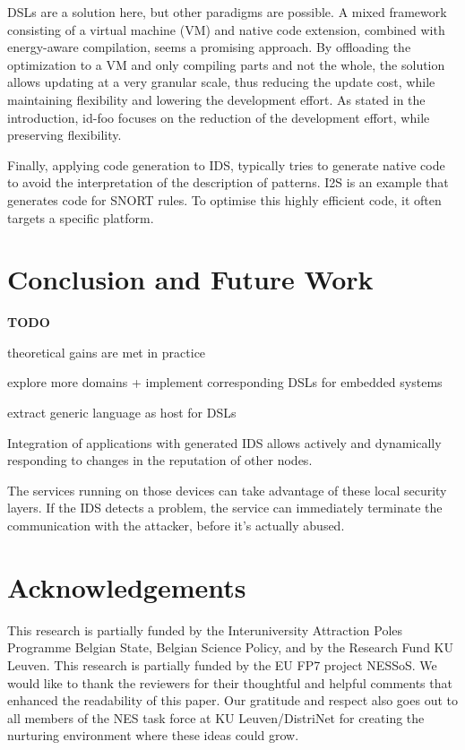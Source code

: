 \documentclass[conference]{IEEEtran}
\newcommand{\TODO}{\textbf{\color{red}TODO}}
\newcommand{\NAME}{id-foo\xspace}
\begin{document}
DSLs are a solution here, but other paradigms are possible. A mixed framework
consisting of a virtual machine (VM) and native code
extension\cite{sadilek2007energy}, combined with energy-aware compilation,
seems a promising approach. By offloading the optimization to a VM and only
compiling parts and not the whole, the solution allows updating at a very
granular scale, thus reducing the update cost, while maintaining flexibility
and lowering the development effort. As stated in the introduction, \NAME
focuses on the reduction of the development effort, while preserving
flexibility.

Finally, applying code generation to IDS, typically tries to generate native
code to avoid the interpretation of the description of patterns.
I2S\cite{charitakis2003code} is an example that generates code for
SNORT\cite{roesch1999snort} rules. To optimise this highly efficient code, it
often targets a specific platform.

\section{Conclusion and Future Work}
\label{conclusion}

\TODO

theoretical gains are met in practice

explore more domains + implement corresponding DSLs for embedded systems

extract generic language as host for DSLs

Integration of applications with generated IDS allows actively and dynamically
responding to changes in the reputation of other nodes.

The services running on those devices can take advantage of these local
security layers. If the IDS detects a problem, the service can immediately
terminate the communication with the attacker, before it's actually abused.

\section*{Acknowledgements}

This research is partially funded by the Interuniversity Attraction Poles
Programme Belgian State, Belgian Science Policy, and by the Research Fund KU
Leuven. This research is partially funded by the EU FP7 project NESSoS. We
would like to thank the reviewers for their thoughtful and helpful comments
that enhanced the readability of this paper. Our gratitude and respect also
goes out to all members of the NES task force at KU Leuven/DistriNet for
creating the nurturing environment where these ideas could grow.



\end{document}
